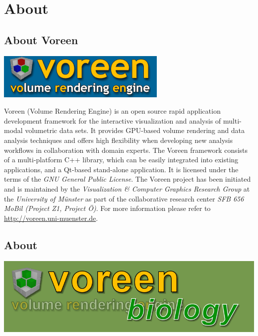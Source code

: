\section{About \Voreen} 
\label{section:about}

\subsection{About Voreen}

 \includegraphics[scale=0.8,keepaspectratio=true]{./images/voreen-banner.png}

Voreen (Volume Rendering Engine) is an open source rapid application development framework for the interactive visualization and analysis of 
multi-modal volumetric data sets. It provides GPU-based volume rendering and data analysis techniques and offers high 
flexibility when developing new analysis workflows in collaboration with domain experts. 
The Voreen framework consists of a multi-platform C++ library, which can be easily integrated into existing applications, 
and a Qt-based stand-alone application. It is licensed under the terms of the \emph{GNU General Public License}. 
The Voreen project has been initiated and is maintained by the \emph{Visualization \& Computer Graphics Research Group} at 
the \emph{University of Münster} as part of the collaborative research center \emph{SFB 656 MoBil (Project Z1, Project Ö)}.
For more information please refer to \url{http://voreen.uni-muenster.de}.

\subsection{About \Voreen}

\includegraphics[scale=0.3,keepaspectratio=true]{./images/logo_bio.png}

